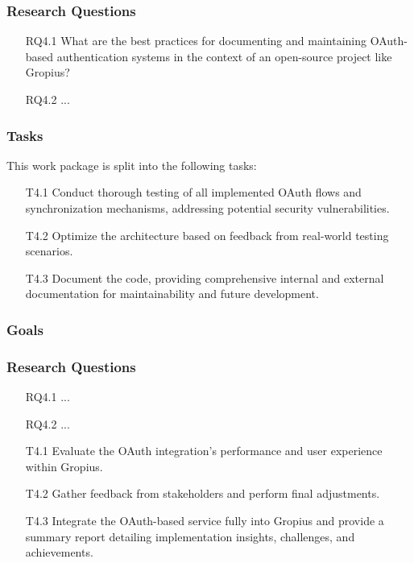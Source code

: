 \subsubsection{Research Questions}
\begin{itemize}
	\item[RQ4.1] What are the best practices for documenting and maintaining OAuth-based authentication systems in the context of an open-source project like Gropius?
	\item[RQ4.2] ...
\end{itemize}

\subsubsection{Tasks}
This work package is split into the following tasks:
\begin{itemize}
	\item[T4.1] Conduct thorough testing of all implemented OAuth flows and synchronization mechanisms, addressing potential security vulnerabilities.
	\item[T4.2] Optimize the architecture based on feedback from real-world testing scenarios.
	\item[T4.3] Document the code, providing comprehensive internal and external documentation for maintainability and future development.
\end{itemize}


\subsubsection{Goals}


\subsubsection{Research Questions}
\begin{itemize}
	\item[RQ4.1] ...
	\item[RQ4.2] ...
\end{itemize}
\begin{itemize}
	\item[T4.1] Evaluate the OAuth integration’s performance and user experience within Gropius.
	\item[T4.2] Gather feedback from stakeholders and perform final adjustments.
	\item[T4.3] Integrate the OAuth-based service fully into Gropius and provide a summary report detailing implementation insights, challenges, and achievements.
\end{itemize}


